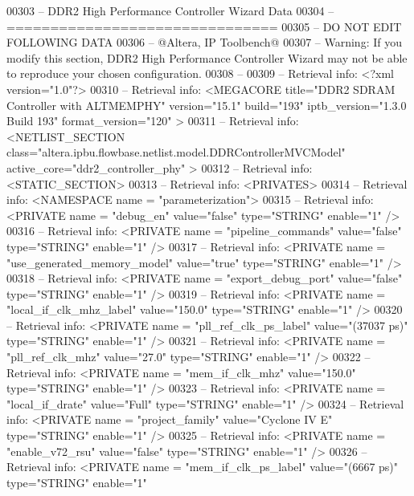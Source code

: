 \begin{DoxyCode}
{00303 \textcolor{keyword}{-- DDR2 High Performance Controller Wizard Data}
00304 \textcolor{keyword}{-- ===============================}
00305 \textcolor{keyword}{-- DO NOT EDIT FOLLOWING DATA}
00306 \textcolor{keyword}{-- @Altera, IP Toolbench@}
00307 \textcolor{keyword}{-- Warning: If you modify this section, DDR2 High Performance Controller Wizard may not be able to
       reproduce your chosen configuration.}
00308 \textcolor{keyword}{-- }
00309 \textcolor{keyword}{-- Retrieval info: <?xml version="1.0"?>}
00310 \textcolor{keyword}{-- Retrieval info: <MEGACORE title="DDR2 SDRAM Controller with ALTMEMPHY"  version="15.1"  build="193" 
       iptb\_version="1.3.0 Build 193"  format\_version="120" >}
00311 \textcolor{keyword}{-- Retrieval info:  <NETLIST\_SECTION class="altera.ipbu.flowbase.netlist.model.DDRControllerMVCModel" 
       active\_core="ddr2\_controller\_phy" >}
00312 \textcolor{keyword}{-- Retrieval info:   <STATIC\_SECTION>}
00313 \textcolor{keyword}{-- Retrieval info:    <PRIVATES>}
00314 \textcolor{keyword}{-- Retrieval info:     <NAMESPACE name = "parameterization">}
00315 \textcolor{keyword}{-- Retrieval info:      <PRIVATE name = "debug\_en" value="false"  type="STRING"  enable="1" />}
00316 \textcolor{keyword}{-- Retrieval info:      <PRIVATE name = "pipeline\_commands" value="false"  type="STRING"  enable="1" />}
00317 \textcolor{keyword}{-- Retrieval info:      <PRIVATE name = "use\_generated\_memory\_model" value="true"  type="STRING" 
       enable="1" />}
00318 \textcolor{keyword}{-- Retrieval info:      <PRIVATE name = "export\_debug\_port" value="false"  type="STRING"  enable="1" />}
00319 \textcolor{keyword}{-- Retrieval info:      <PRIVATE name = "local\_if\_clk\_mhz\_label" value="150.0"  type="STRING"  enable="1"
       />}
00320 \textcolor{keyword}{-- Retrieval info:      <PRIVATE name = "pll\_ref\_clk\_ps\_label" value="(37037 ps)"  type="STRING" 
       enable="1" />}
00321 \textcolor{keyword}{-- Retrieval info:      <PRIVATE name = "pll\_ref\_clk\_mhz" value="27.0"  type="STRING"  enable="1" />}
00322 \textcolor{keyword}{-- Retrieval info:      <PRIVATE name = "mem\_if\_clk\_mhz" value="150.0"  type="STRING"  enable="1" />}
00323 \textcolor{keyword}{-- Retrieval info:      <PRIVATE name = "local\_if\_drate" value="Full"  type="STRING"  enable="1" />}
00324 \textcolor{keyword}{-- Retrieval info:      <PRIVATE name = "project\_family" value="Cyclone IV E"  type="STRING"  enable="1" />}
00325 \textcolor{keyword}{-- Retrieval info:      <PRIVATE name = "enable\_v72\_rsu" value="false"  type="STRING"  enable="1" />}
00326 \textcolor{keyword}{-- Retrieval info:      <PRIVATE name = "mem\_if\_clk\_ps\_label" value="(6667 ps)"  type="STRING"  enable="1"
}}
\end{DoxyCode}
